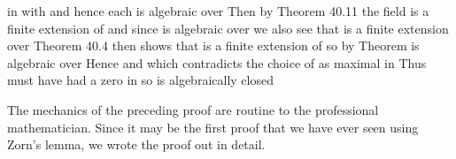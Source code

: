 \documentclass[11pt,oneside]{article}
\begin{document}
\begin{BookBody}

\noindent in  with  and hence each  is algebraic over  Then by Theorem 40.11 the field  is a finite extension of  and since \BookInline{\beta } is algebraic over  we also see that  is a finite extension over  Theorem 40.4 then shows that  is a finite extension of  so by Theorem  is algebraic over  Hence  and  which contradicts the choice of  as maximal in  Thus  must have had a zero in  so  is algebraically closed\BookEnd{\blacklozenge}

The mechanics of the preceding proof are routine to the professional mathematician. Since it may be the first proof that we have ever seen using Zorn’s lemma, we wrote the proof out in detail.

\end{BookBody}

\BookNarrativefalse
\end{document}
